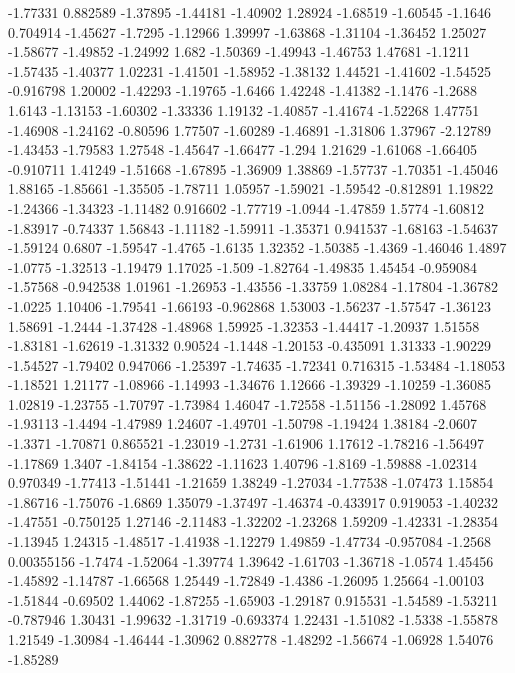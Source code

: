 \documentclass[9pt]{article}
\theoremstyle{plain}
\theoremstyle{definition}
\theoremstyle{remark}
\numberwithin{equation}{section}
\begin{document}
-1.77331
0.882589
-1.37895
-1.44181
-1.40902
1.28924
-1.68519
-1.60545
-1.1646
0.704914
-1.45627
-1.7295
-1.12966
1.39997
-1.63868
-1.31104
-1.36452
1.25027
-1.58677
-1.49852
-1.24992
1.682
-1.50369
-1.49943
-1.46753
1.47681
-1.1211
-1.57435
-1.40377
1.02231
-1.41501
-1.58952
-1.38132
1.44521
-1.41602
-1.54525
-0.916798
1.20002
-1.42293
-1.19765
-1.6466
1.42248
-1.41382
-1.1476
-1.2688
1.6143
-1.13153
-1.60302
-1.33336
1.19132
-1.40857
-1.41674
-1.52268
1.47751
-1.46908
-1.24162
-0.80596
1.77507
-1.60289
-1.46891
-1.31806
1.37967
-2.12789
-1.43453
-1.79583
1.27548
-1.45647
-1.66477
-1.294
1.21629
-1.61068
-1.66405
-0.910711
1.41249
-1.51668
-1.67895
-1.36909
1.38869
-1.57737
-1.70351
-1.45046
1.88165
-1.85661
-1.35505
-1.78711
1.05957
-1.59021
-1.59542
-0.812891
1.19822
-1.24366
-1.34323
-1.11482
0.916602
-1.77719
-1.0944
-1.47859
1.5774
-1.60812
-1.83917
-0.74337
1.56843
-1.11182
-1.59911
-1.35371
0.941537
-1.68163
-1.54637
-1.59124
0.6807
-1.59547
-1.4765
-1.6135
1.32352
-1.50385
-1.4369
-1.46046
1.4897
-1.0775
-1.32513
-1.19479
1.17025
-1.509
-1.82764
-1.49835
1.45454
-0.959084
-1.57568
-0.942538
1.01961
-1.26953
-1.43556
-1.33759
1.08284
-1.17804
-1.36782
-1.0225
1.10406
-1.79541
-1.66193
-0.962868
1.53003
-1.56237
-1.57547
-1.36123
1.58691
-1.2444
-1.37428
-1.48968
1.59925
-1.32353
-1.44417
-1.20937
1.51558
-1.83181
-1.62619
-1.31332
0.90524
-1.1448
-1.20153
-0.435091
1.31333
-1.90229
-1.54527
-1.79402
0.947066
-1.25397
-1.74635
-1.72341
0.716315
-1.53484
-1.18053
-1.18521
1.21177
-1.08966
-1.14993
-1.34676
1.12666
-1.39329
-1.10259
-1.36085
1.02819
-1.23755
-1.70797
-1.73984
1.46047
-1.72558
-1.51156
-1.28092
1.45768
-1.93113
-1.4494
-1.47989
1.24607
-1.49701
-1.50798
-1.19424
1.38184
-2.0607
-1.3371
-1.70871
0.865521
-1.23019
-1.2731
-1.61906
1.17612
-1.78216
-1.56497
-1.17869
1.3407
-1.84154
-1.38622
-1.11623
1.40796
-1.8169
-1.59888
-1.02314
0.970349
-1.77413
-1.51441
-1.21659
1.38249
-1.27034
-1.77538
-1.07473
1.15854
-1.86716
-1.75076
-1.6869
1.35079
-1.37497
-1.46374
-0.433917
0.919053
-1.40232
-1.47551
-0.750125
1.27146
-2.11483
-1.32202
-1.23268
1.59209
-1.42331
-1.28354
-1.13945
1.24315
-1.48517
-1.41938
-1.12279
1.49859
-1.47734
-0.957084
-1.2568
0.00355156
-1.7474
-1.52064
-1.39774
1.39642
-1.61703
-1.36718
-1.0574
1.45456
-1.45892
-1.14787
-1.66568
1.25449
-1.72849
-1.4386
-1.26095
1.25664
-1.00103
-1.51844
-0.69502
1.44062
-1.87255
-1.65903
-1.29187
0.915531
-1.54589
-1.53211
-0.787946
1.30431
-1.99632
-1.31719
-0.693374
1.22431
-1.51082
-1.5338
-1.55878
1.21549
-1.30984
-1.46444
-1.30962
0.882778
-1.48292
-1.56674
-1.06928
1.54076
-1.85289
\end{document}
